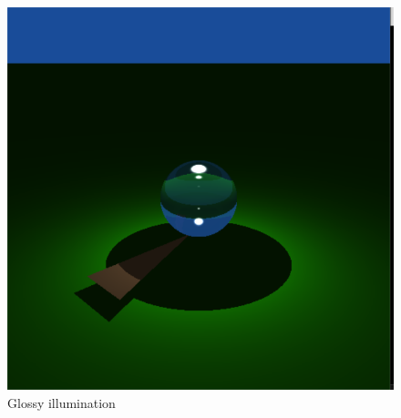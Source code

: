 \begin{figure}[H]
\centering
\includegraphics[scale=\imagescale]{images/worksheet_2/part_5}
\caption{Glossy illumination}
\label{fig:glossy_reflections}
\end{figure}